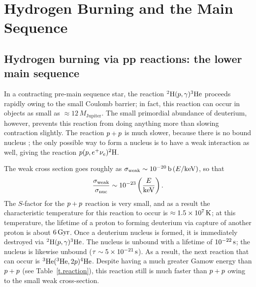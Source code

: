 \chapter[Main Sequence]{Hydrogen Burning and the Main Sequence}

\section[The pp chain]{Hydrogen burning via pp reactions: the lower main sequence}
\label{s.lower-ms}

In a contracting pre-main sequence star, the reaction $\hydrogen[2](p,\gamma)\helium[3]$ proceeds rapidly owing to the small Coulomb barrier; in fact, this reaction can occur in objects as small as $\approx 12\,M_{\mathrm{Jupiter}}$.  The small primordial abundance of deuterium, however, prevents this reaction from doing anything more than slowing contraction slightly.  The reaction $\pt +\pt$ is much slower, because there is no bound nucleus \helium[2]; the only possible way to form a nucleus is to have a weak interaction as well, giving the reaction $\pt(\pt,e^{+}\nu_{e})\hydrogen[2]$.

The weak cross section goes roughly as $\sigma_{\mathrm{weak}} \sim 10^{-20}\nsp\barn\left(E/\keV\right)$, so that
\[ \frac{\sigma_{\mathrm{weak}}}{\sigma_{\mathrm{nuc}}} \sim 10^{-23}\left(\frac{E}{\keV}\right). \]
The $S$-factor for the $\pt+\pt$ reaction is very small, and as a result the characteristic temperature for this reaction to occur is $\approx 1.5\ee{7}\nsp\K$; at this temperature, the lifetime of a proton to forming deuterium via capture of another proton is about $6\nsp\Giga\yr$.  Once a deuterium nucleus is formed, it is immediately destroyed via $\hydrogen[2](p,\gamma)\helium[3]$. The nucleus \lithium[4] is unbound with a lifetime of $10^{-22}\nsp\second$; the nucleus \beryllium[6] is likewise unbound ($\tau \sim 5\ee{-21}\nsp\second$). As a result, the next reaction that can occur is $\helium[3](\helium[3],2\pt)\helium$.  Despite having a much greater Gamow energy than $\pt + \pt$ (see Table~\ref{t.reaction}), this reaction still is much faster than $\pt+\pt$ owing to the small weak cross-section.

